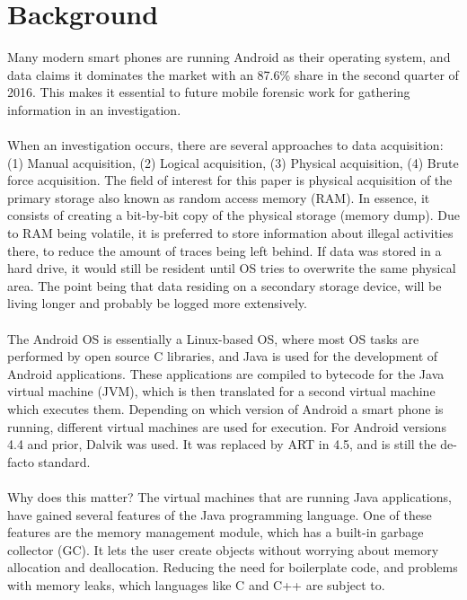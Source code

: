 \section{Background}
\label{background}
Many modern smart phones are running Android as their operating system, and data claims it dominates the market with an 87.6\% share in the second quarter of 2016\cite{idc}. This makes it essential to future mobile forensic work for gathering information in an investigation.\\
\\
When an investigation occurs, there are several approaches to data acquisition: (1) Manual acquisition, (2) Logical acquisition, (3) Physical acquisition, (4) Brute force acquisition. The field of interest for this paper is physical acquisition of the primary storage also known as random access memory (RAM). In essence, it consists of creating a bit-by-bit copy of the physical storage (memory dump). Due to RAM being volatile, it is preferred to store information about illegal activities there, to reduce the amount of traces being left behind. If data was stored in a hard drive, it would still be resident until OS tries to overwrite the same physical area. The point being that data residing on a secondary storage device, will be living longer and probably be logged more extensively.\\
\\
The Android OS is essentially a Linux-based OS, where most OS tasks are performed by open source C libraries, and Java is used for the development of Android applications. These applications are compiled to bytecode for the Java virtual machine (JVM), which is then translated for a second virtual machine which executes them. Depending on which version of Android a smart phone is running, different virtual machines are used for execution.
For Android versions 4.4 and prior, Dalvik was used. It was replaced by ART in 4.5, and is still the de-facto standard.\\
\\
Why does this matter? The virtual machines that are running Java applications, have gained several features of the Java programming language. One of these features are the memory management module, which has a built-in garbage collector (GC). It lets the user create objects without worrying about memory allocation and deallocation. Reducing the need for boilerplate code, and problems with memory leaks, which languages like C and C++ are subject to. \\
\\
